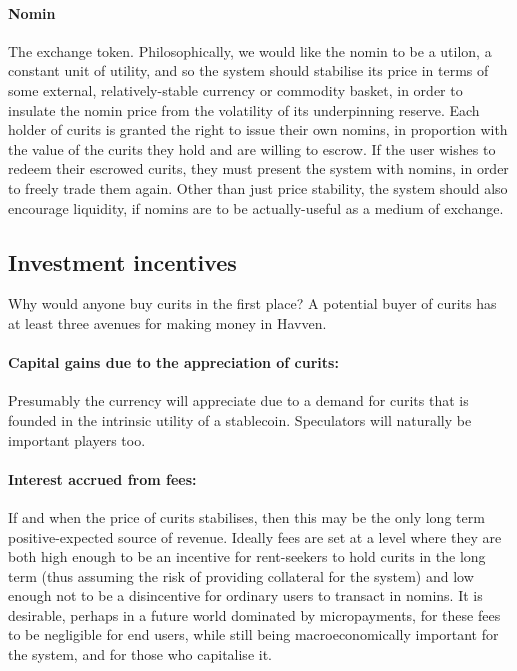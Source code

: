 \documentclass{article}
\begin{document}
\paragraph{Nomin} The exchange token. Philosophically, we would like the nomin to be a utilon, a constant
unit of utility, and so the system should stabilise its price in terms of some external, relatively-stable
currency or commodity basket, in order to insulate the nomin price from the volatility of its 
underpinning reserve. Each holder of curits is granted the right to issue their own nomins, in proportion
with the value of the curits they hold and are willing to escrow. If the user wishes to redeem their escrowed curits,
they must present the system with nomins, in order to freely trade them again. Other than just price stability,
the system should also encourage liquidity, if nomins are to be actually-useful as a medium of exchange.


\pagebreak
\subsection{Investment incentives}
Why would anyone buy curits in the first place? A potential buyer of curits has at least three avenues for making
money in Havven.

\paragraph{Capital gains due to the appreciation of curits:}
Presumably the currency will appreciate due to a demand for curits that is founded in the intrinsic
utility of a stablecoin. Speculators will naturally be important players too.

\paragraph{Interest accrued from fees:}
If and when the price of curits stabilises, then this may be the only long term positive-expected
source of revenue. Ideally fees are set at a level where they are both high enough to be an incentive
for rent-seekers to hold curits in the long term (thus assuming the risk of providing collateral for
the system) and low enough not to be a disincentive for ordinary users to transact in nomins.
It is desirable, perhaps in a future world dominated by micropayments, for these fees to be
negligible for end users, while still being macroeconomically important for the system, and for those
who capitalise it.
\end{document}
